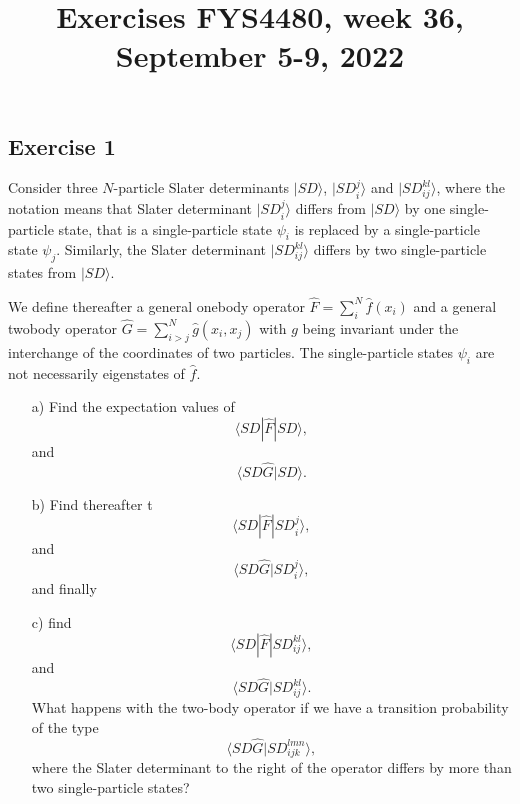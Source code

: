 \documentclass[prc]{revtex4}
\begin{document}
\title{Exercises FYS4480, week 36, September 5-9, 2022}
\maketitle
\subsection*{Exercise 1}
Consider three $N$-particle 
Slater determinants $|SD\rangle$, $|SD_i^j\rangle$ and $|SD_{ij}^{kl}\rangle$, where the notation means that 
Slater determinant $|SD_i^j\rangle$ differs from $|SD\rangle$ by one single-particle state, that is a single-particle
state $\psi_i$ is replaced by a single-particle state $\psi_j$. Similarly, the Slater determinant $|SD_{ij}^{kl}\rangle$
differs by two single-particle states from $|SD\rangle$.

We define thereafter a general onebody operator $\hat{F} = \sum_{i}^N\hat{f}(x_{i})$ and a general 
twobody operator $\hat{G}=\sum_{i>j}^N\hat{g}(x_{i},x_{j})$
with $g$ being invariant under the interchange of the coordinates of two particles.
The single-particle states $\psi_i$ are not necessarily eigenstates of $\hat{f}$.
\begin{enumerate}
\item[a)] Find the expectation values of 
\[
\langle SD |\hat{F}|SD\rangle,
\]
and
\[
\langle SD\hat{G}|SD\rangle.
\]
\item[b)] Find thereafter t
\[
\langle SD |\hat{F}|SD_i^j\rangle,
\]
and
\[
\langle SD\hat{G}|SD_i^j\rangle,
\]
and finally
\item[c)] find 
\[
\langle SD |\hat{F}|SD_{ij}^{kl}\rangle,
\]
and
\[
\langle SD\hat{G}|SD_{ij}^{kl}\rangle.
\]
What happens with the two-body operator if we have a transition probability  of the type
\[
\langle SD\hat{G}|SD_{ijk}^{lmn}\rangle,
\]
where the Slater determinant to the right of the operator differs by more than two single-particle states?
\end{enumerate}
\end{document}
